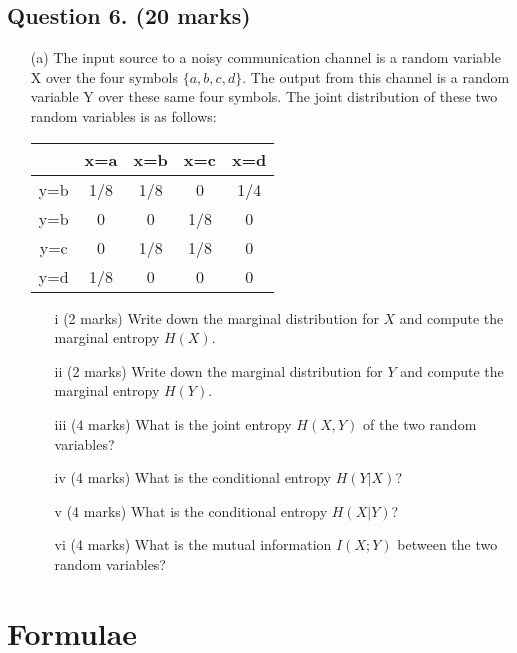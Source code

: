 
\subsection*{Question 6. (20 marks) }
\begin{itemize}
\item[(a)]
The input source to a noisy communication channel is a random variable X over the
four symbols $\{a, b, c, d\}$. The output from this channel is a random variable Y over these same
four symbols. The joint distribution of these two random variables is as follows:\\ \bigskip

\begin{center}
\begin{tabular}{|c|c|c|c|c|}
\hline
&x=a& x=b & x=c & x=d \\ \hline
y=b &1/8 &1/8 &0 &1/4 \\ \hline
y=b &0 & 0& 1/8& 0 \\ \hline
y=c & 0&1/8 & 1/8 & 0\\ \hline
y=d & 1/8& 0& 0 & 0\\ \hline
\end{tabular}
\end{center}

\begin{itemize}
\item[i] (2 marks) Write down the marginal distribution for $X$ and compute the marginal entropy $H(X)$.
\item[ii] (2 marks) Write down the marginal distribution for $Y$ and compute the marginal entropy $H(Y )$.
\item[iii] (4 marks) What is the joint entropy $H(X, Y ) $ of the two random variables?
\item[iv] (4 marks) What is the conditional entropy $H(Y|X)$?
\item[v] (4 marks) What is the conditional entropy $H(X|Y)$?
\item[vi] (4 marks) What is the mutual information $I(X;Y)$ between the two random variables?
\end{itemize}

\end{itemize}
\newpage




\newpage
\section*{Formulae}
